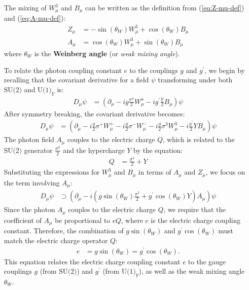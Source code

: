 The mixing of $W_\mu^3$ and $B_\mu$ can be written as the definition from (\ref{eq:Z-mu-def}) and (\ref{eq:A-mu-def}):
\begin{align*}
    Z_\mu &= -\sin(\theta_W) W_\mu^3 + \cos(\theta_W) B_\mu\\
    A_\mu &= \cos(\theta_W) W_\mu^3 + \sin(\theta_W) B_\mu
\end{align*}
where $\theta_W$ is the \textbf{Weinberg angle} (or \textit{weak mixing angle}).

To relate the photon coupling constant $e$ to the couplings $g$ and $g^\prime $, we begin by recalling that the covariant derivative for a field $\psi$ transforming under both $\text{SU(2)}$ and $\text{U(1)}_Y$ is:
\begin{align}
    D_\mu \psi &= \left( \partial_\mu - i g \frac{\sigma^a}{2} W_\mu^a - i g^\prime  \frac{Y}{2} B_\mu \right) \psi
\end{align}
After symmetry breaking, the covariant derivative becomes:
\begin{align}
    D_\mu \psi &= \left( \partial_\mu - i \frac{g}{2} \sigma^+ W_\mu^+ - i \frac{g}{2} \sigma^- W_\mu^- - i \frac{g}{2} \sigma^3 W_\mu^3 - i \frac{g^\prime }{2} Y B_\mu \right) \psi
\end{align}
The photon field $A_\mu$ couples to the electric charge $Q$, which is related to the $\text{SU(2)}$ generator $\displaystyle \frac{\sigma^3}{2}$ and the hypercharge $Y$ by the equation:
\begin{align}
    Q &= \frac{\sigma^3}{2} + Y
\end{align}
Substituting the expressions for $W_\mu^3$ and $B_\mu$ in terms of $A_\mu$ and $Z_\mu$, we focus on the term involving $A_\mu$:
\begin{align}
    D_\mu \psi &\supset \left( \partial_\mu - i \left( g \sin(\theta_W) \frac{\sigma^3}{2} + g^\prime  \cos(\theta_W) Y \right) A_\mu \right) \psi
\end{align}
Since the photon $A_\mu$ couples to the electric charge $Q$, we require that the coefficient of $A_\mu$ be proportional to $eQ$, where $e$ is the electric charge coupling constant. Therefore, the combination of $g \sin(\theta_W)$ and $g^\prime  \cos(\theta_W)$ must match the electric charge operator $Q$:
\begin{align}
    e &= g \sin(\theta_W) = g^\prime  \cos(\theta_W).\label{eq:e-def-weingberg-angle}
\end{align}
This equation relates the electric charge coupling constant $e$ to the gauge couplings $g$ (from $\text{SU(2)}$) and $g^\prime $ (from $\text{U(1)}_Y$), as well as the weak mixing angle $\theta_W$.

